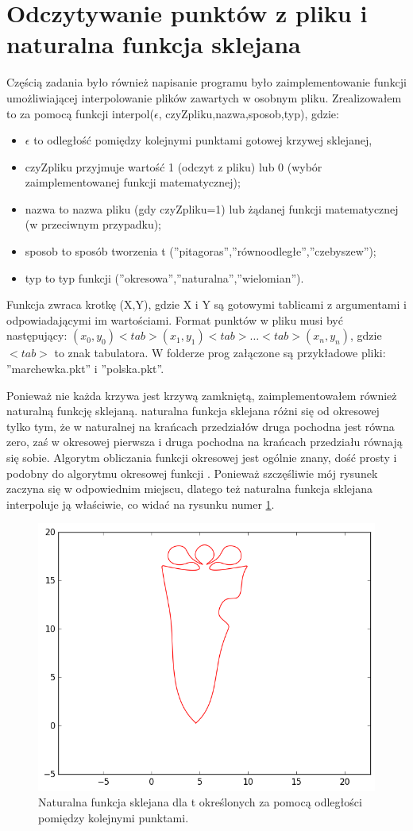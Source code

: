 \documentclass{article}
\begin{document}
\section{Odczytywanie punktów z pliku i naturalna funkcja sklejana}

Częścią zadania było również napisanie programu było zaimplementowanie funkcji umożliwiającej interpolowanie plików zawartych w osobnym pliku. Zrealizowałem to za pomocą funkcji interpol($\epsilon$, czyZpliku,nazwa,sposob,typ),   gdzie: \\
\begin{itemize}
\item $\epsilon$ to odległość pomiędzy kolejnymi punktami gotowej krzywej sklejanej, \\
\item czyZpliku przyjmuje wartość 1 (odczyt z pliku) lub 0 (wybór zaimplementowanej funkcji matematycznej); \\
\item nazwa to nazwa pliku (gdy czyZpliku=1) lub żądanej funkcji matematycznej (w przeciwnym przypadku);\\
\item sposob to sposób tworzenia t (''pitagoras'',''równoodległe'',''czebyszew'');\\
\item typ to typ funkcji (''okresowa'',''naturalna'',''wielomian'').\\
\end{itemize}
Funkcja zwraca krotkę (X,Y), gdzie X i Y są gotowymi tablicami z argumentami i odpowiadającymi im wartościami.
Format punktów w pliku musi być następujący:
$(x_0,y_0)<tab>(x_1,y_1)<tab>\ldots<tab>(x_n,y_n) $, gdzie $<tab>$ to znak tabulatora. W folderze prog załączone są przykładowe pliki: ''marchewka.pkt'' i ''polska.pkt''.

Ponieważ nie każda krzywa jest krzywą zamkniętą, zaimplementowałem również naturalną funkcję sklejaną. naturalna funkcja sklejana różni się od okresowej tylko tym, że w naturalnej na krańcach przedziałów druga pochodna jest równa zero, zaś w okresowej pierwsza i druga pochodna na krańcach przedziału równają się sobie. Algorytm obliczania funkcji okresowej jest ogólnie znany, dość prosty i podobny do algorytmu okresowej funkcji \cite{bib1}. Ponieważ szczęśliwie mój rysunek zaczyna się w odpowiednim miejscu, dlatego też 
naturalna funkcja sklejana interpoluje ją właściwie, co widać na rysunku numer \ref{p-n}.

\begin{figure}[H]
    \centering
	\includegraphics[width= 0.5 \textwidth]{nat-mrchw.png}
    \caption{Naturalna funkcja sklejana dla t określonych za pomocą odległości pomiędzy kolejnymi punktami. }
 	\label{p-n}
\end{figure}
\end{document}
